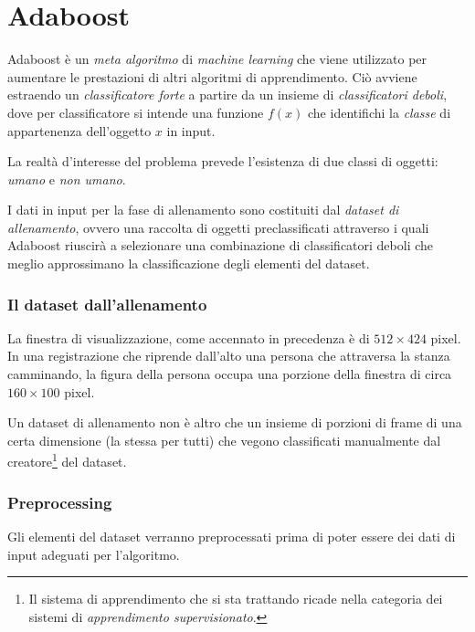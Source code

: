 
\chapter{Adaboost}
\label{cap:adaboost}

Adaboost è un \emph{meta algoritmo} di \emph{machine learning} che viene utilizzato per aumentare le prestazioni di altri algoritmi di apprendimento. Ciò avviene estraendo un \emph{classificatore forte} a partire da un insieme di \emph{classificatori deboli}, dove per classificatore si intende una funzione $f(x)$ che identifichi la \emph{classe} di appartenenza dell'oggetto $x$ in input.

La realtà d'interesse del problema prevede l'esistenza di due classi di oggetti: \emph{umano} e \emph{non umano}.

I dati in input per la fase di allenamento sono costituiti dal \emph{dataset di allenamento}, ovvero una raccolta di oggetti preclassificati attraverso i quali Adaboost riuscirà a selezionare una combinazione di classificatori deboli che meglio approssimano la classificazione degli elementi del dataset.

\subsection{Il dataset dall'allenamento} %
\label{sub:il_dataset_dall_allenamento}
La finestra di visualizzazione, come accennato in precedenza è di $512 \times 424$ pixel. In una registrazione che riprende dall'alto una persona che attraversa la stanza camminando, la figura della persona occupa una porzione della finestra di circa $160 \times 100$ pixel.

Un dataset di allenamento non è altro che un insieme di porzioni di frame di una certa dimensione (la stessa per tutti) che vegono classificati manualmente dal creatore\footnote{Il sistema di apprendimento che si sta trattando ricade nella categoria dei sistemi di \emph{apprendimento supervisionato}.} del dataset.


\subsection{Preprocessing} %
\label{sub:preprocessing}
Gli elementi del dataset verranno preprocessati prima di poter essere dei dati di input adeguati per l'algoritmo.

